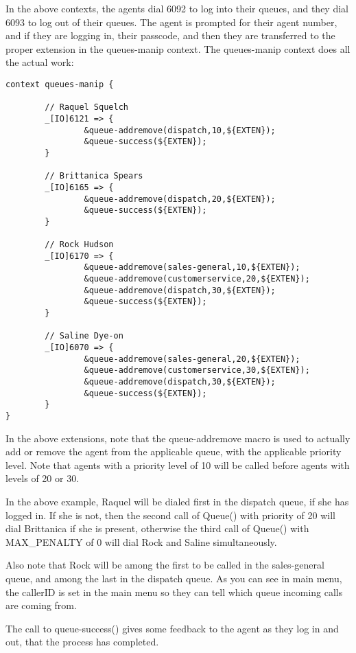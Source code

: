 In the above contexts, the agents dial 6092 to log into their queues,
and they dial 6093 to log out of their queues. The agent is prompted
for their agent number, and if they are logging in, their passcode, 
and then they are transferred to the proper extension in the 
queues-manip context.  The queues-manip context does all the 
actual work:

\begin{verbatim}
context queues-manip {

        // Raquel Squelch
        _[IO]6121 => {
                &queue-addremove(dispatch,10,${EXTEN});
                &queue-success(${EXTEN});
        }

        // Brittanica Spears
        _[IO]6165 => {
                &queue-addremove(dispatch,20,${EXTEN});
                &queue-success(${EXTEN});
        }

        // Rock Hudson
        _[IO]6170 => {
                &queue-addremove(sales-general,10,${EXTEN});
                &queue-addremove(customerservice,20,${EXTEN});
                &queue-addremove(dispatch,30,${EXTEN});
                &queue-success(${EXTEN});
        }

        // Saline Dye-on
        _[IO]6070 => {
                &queue-addremove(sales-general,20,${EXTEN});
                &queue-addremove(customerservice,30,${EXTEN});
                &queue-addremove(dispatch,30,${EXTEN});
                &queue-success(${EXTEN});
        }
}
\end{verbatim}

In the above extensions, note that the queue-addremove macro is used
to actually add or remove the agent from the applicable queue,
with the applicable priority level. Note that agents with a 
priority level of 10 will be called before agents with levels
of 20 or 30.

In the above example, Raquel will be dialed first in the dispatch
queue, if she has logged in. If she is not, then the second call of
Queue() with priority of 20 will dial Brittanica if she is present,
otherwise the third call of Queue() with MAX\_PENALTY of 0 will 
dial Rock and Saline simultaneously.

Also note that Rock will be among the first to be called in the sales-general 
queue, and among the last in the dispatch queue. As you can see in
main menu, the callerID is set in the main menu so they can tell 
which queue incoming calls are coming from.

The call to queue-success() gives some feedback to the agent
as they log in and out, that the process has completed.

